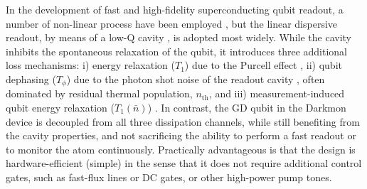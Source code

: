 In the development of fast and high-fidelity superconducting qubit
readout, a number of non-linear process have been employed \citep{cooper2004,Astafiev2004-readout,Siddiqi2006,Lupascu2006-readout,Mallet2009-readout,Reed2010-readout},
but the linear dispersive readout, by means of a low-Q cavity \citep{Wallraff2005-readout,Blais2004,Johnson2012-readout,Riste2012-readout},
is adopted most widely. While the cavity inhibits the spontaneous
relaxation of the qubit, it introduces three additional loss mechanisms:
i) energy relaxation ($T_{1}$) due to the Purcell effect \citep{Esteve1986,Koch2007,Neeley2008-Purcell},
ii) qubit dephasing ($T_{\phi}$) due to the photon shot noise of
the readout cavity \citep{Blais2004,Schuster2005-ACStark,Gambetta2006-dephasing,Schuster2007,Gambetta2008-qm-traj,Sears2012-PhotonShot,Rigetti2012},
often dominated by residual thermal population, $n_{\mathrm{th}}$,
and iii) measurement-induced qubit energy relaxation ($T_{1}\left(\bar{n}\right)$)
\citep{Boissonneault2009-Photon-induced-relax,Slichter2012,Sank2016-T1vsNbar,Slichter2016-T1vsNbar}.
In contrast, the GD qubit in the Darkmon device is decoupled from
all three dissipation channels, while still benefiting from the cavity
properties, and not sacrificing the ability to perform a fast readout
or to monitor the atom continuously. Practically advantageous is that
the design is hardware-efficient (simple) in the sense that it does
not require additional control gates, such as fast-flux lines or DC
gates, or other high-power pump tones. 

